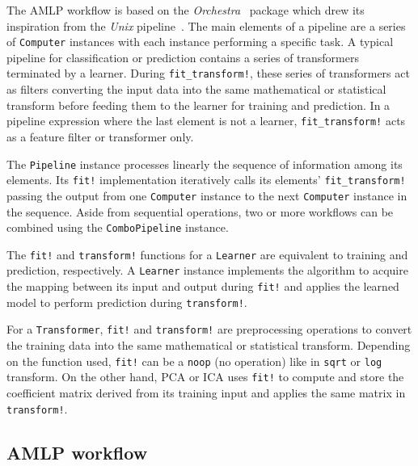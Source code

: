 \documentclass{juliacon}
\begin{document}
\vskip 6pt

The AMLP workflow is based on the \emph{Orchestra}~\cite{orchestra2014}
package which drew its inspiration from the \emph{Unix} pipeline~\cite{unix84}.
The main elements of a pipeline are a series of \texttt{Computer} instances with each instance performing a specific task. A typical pipeline for classification or
prediction  contains a series of transformers terminated by a learner.  During
\texttt{fit\_transform!}, these series of transformers act as filters
converting the input data into the same mathematical or statistical transform
before feeding them to the learner for training and prediction. In a pipeline
expression where the last element is not a learner, \texttt{fit\_transform!}
acts as a feature filter or transformer only.

\vskip 6pt

The \texttt{Pipeline} instance processes linearly the sequence of information
among its elements.  Its \texttt{fit!} implementation iteratively calls its
elements' \texttt{fit\_transform!} passing the output from one
\texttt{Computer} instance to the next \texttt{Computer} instance in the
sequence. Aside from sequential operations, two or more workflows can be
combined using the \texttt{ComboPipeline} instance.

\vskip 6pt

The \texttt{fit!} and \texttt{transform!} functions for a \texttt{Learner} are
equivalent to training and prediction, respectively. A \texttt{Learner}
instance implements the algorithm to acquire the mapping between its input and
output during \texttt{fit!}  and applies the learned model to perform
prediction during \texttt{transform!}.

\vskip 6pt

For a \texttt{Transformer}, \texttt{fit!} and \texttt{transform!} are
preprocessing operations to convert the training data into the same
mathematical or statistical transform.  Depending on the function used,
\texttt{fit!} can be a \texttt{noop} (no operation) like in \texttt{sqrt} or
\texttt{log} transform.  On the other hand, PCA or ICA uses \texttt{fit!} to
compute and store the coefficient matrix derived from its training input and
applies the same matrix in \texttt{transform!}.

\subsection{AMLP workflow}
\label{amlpworkflow}
\end{document}
